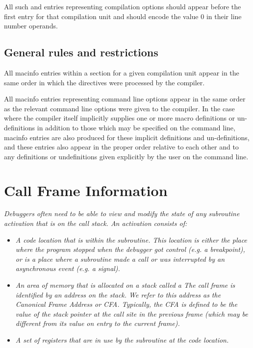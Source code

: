 All such \DWMACINFOdefine{} and \DWMACINFOundef{} entries
representing compilation options should appear before the
first \DWMACINFOstartfile{} entry for that compilation unit
and should encode the value 0 in their line number operands.


\subsection{General rules and restrictions}
\label{chap:generalrulesandrestrictions}

All macinfo entries within a \dotdebugmacinfo{}
section for a
given compilation unit appear in the same order in which the
directives were processed by the compiler.

All macinfo entries representing command line options appear
in the same order as the relevant command line options
were given to the compiler. In the case where the compiler
itself implicitly supplies one or more macro definitions or
un-definitions in addition to those which may be specified on
the command line, macinfo entries are also produced for these
implicit definitions and un-definitions, and these entries
also appear in the proper order relative to each other and
to any definitions or undefinitions given explicitly by the
user on the command line.


\section{Call Frame Information}
\label{chap:callframeinformation}

\textit{Debuggers often need to be able to view and modify the state of any subroutine activation that is
on the call stack. An activation consists of:}

\begin{itemize}
\item \textit{A code location that is within the
subroutine. This location is either the place where the program
stopped when the debugger got control (e.g. a breakpoint), or
is a place where a subroutine made a call or was interrupted
by an asynchronous event (e.g. a signal).}

\item \textit{An area of memory that is allocated on a stack called a
 The call frame is identified by an address
on the stack. We refer to this address as the Canonical
Frame Address or CFA. Typically, the CFA is defined to be the
value of the stack pointer at the call site in the previous
frame (which may be different from its value on entry to the
current frame).}

\item \textit{A set of registers that are in use by the subroutine
at the code location.}

\end{itemize}

